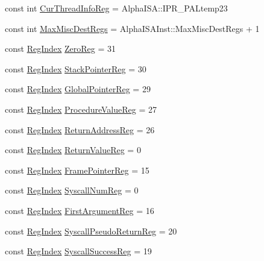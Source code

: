 \begin{DoxyCompactItemize}
\item 
const int \hyperlink{namespaceAlphaISA_a7e5bf2f33f34327efc1eeccbb0c1141f}{CurThreadInfoReg} = AlphaISA::IPR\_\-PALtemp23
\item 
const int \hyperlink{namespaceAlphaISA_a47db6c8581feb5d9094784b480156f0b}{MaxMiscDestRegs} = AlphaISAInst::MaxMiscDestRegs + 1
\item 
const \hyperlink{namespaceAlphaISA_a1c4e98d2e6a11a837bf9ccd20dd32f8a}{RegIndex} \hyperlink{namespaceAlphaISA_a38e079cf64d8a3ced6ce8e52ce269a5e}{ZeroReg} = 31
\item 
const \hyperlink{namespaceAlphaISA_a1c4e98d2e6a11a837bf9ccd20dd32f8a}{RegIndex} \hyperlink{namespaceAlphaISA_a344fcaf70f4d9d6fe84dc5eda59e49eb}{StackPointerReg} = 30
\item 
const \hyperlink{namespaceAlphaISA_a1c4e98d2e6a11a837bf9ccd20dd32f8a}{RegIndex} \hyperlink{namespaceAlphaISA_a569ad17fb9f0eb70ebdb6f8b1c1ab5ce}{GlobalPointerReg} = 29
\item 
const \hyperlink{namespaceAlphaISA_a1c4e98d2e6a11a837bf9ccd20dd32f8a}{RegIndex} \hyperlink{namespaceAlphaISA_a918dcb458d920fe32f90d942585cc4e5}{ProcedureValueReg} = 27
\item 
const \hyperlink{namespaceAlphaISA_a1c4e98d2e6a11a837bf9ccd20dd32f8a}{RegIndex} \hyperlink{namespaceAlphaISA_ac35e74d63805165abcadf5e48ba17caf}{ReturnAddressReg} = 26
\item 
const \hyperlink{namespaceAlphaISA_a1c4e98d2e6a11a837bf9ccd20dd32f8a}{RegIndex} \hyperlink{namespaceAlphaISA_a5aa17c403dc1152a73ef61c17f4e02cf}{ReturnValueReg} = 0
\item 
const \hyperlink{namespaceAlphaISA_a1c4e98d2e6a11a837bf9ccd20dd32f8a}{RegIndex} \hyperlink{namespaceAlphaISA_a3bd8c9c7538a065181e1e54fea758ada}{FramePointerReg} = 15
\item 
const \hyperlink{namespaceAlphaISA_a1c4e98d2e6a11a837bf9ccd20dd32f8a}{RegIndex} \hyperlink{namespaceAlphaISA_a208b182e71958af642826cde032dcd60}{SyscallNumReg} = 0
\item 
const \hyperlink{namespaceAlphaISA_a1c4e98d2e6a11a837bf9ccd20dd32f8a}{RegIndex} \hyperlink{namespaceAlphaISA_a4ea7a0e850916ddcb5d2b77078e3e0c7}{FirstArgumentReg} = 16
\item 
const \hyperlink{namespaceAlphaISA_a1c4e98d2e6a11a837bf9ccd20dd32f8a}{RegIndex} \hyperlink{namespaceAlphaISA_a6b71a09200f90f7292045d3560f10dad}{SyscallPseudoReturnReg} = 20
\item 
const \hyperlink{namespaceAlphaISA_a1c4e98d2e6a11a837bf9ccd20dd32f8a}{RegIndex} \hyperlink{namespaceAlphaISA_a6c8c50158f99f454a2f011a1806f76c2}{SyscallSuccessReg} = 19

\end{DoxyCompactItemize}
